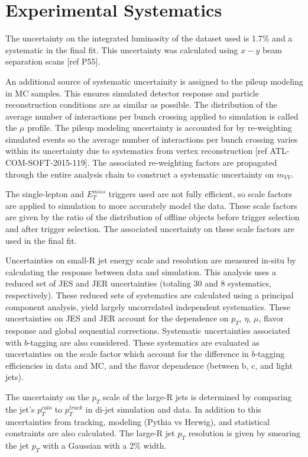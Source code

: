 \section{Experimental Systematics}
The uncertainty on the integrated luminosity of the dataset used is 1.7\% and a systematic in the final fit. This uncertainty was calculated using $x-y$ beam separation scans [ref P55]. 

An additional source of systematic uncertainity is assigned to the pileup modeling in MC samples. This ensures simulated detector response and particle reconstruction conditions are as similar as possible. The distribution of the average number of interactions per bunch crossing applied to simulation is called the $\mu$ profile. The pileup modeling uncertainty is accounted for by re-weighting simulated events so the average number of interactions per bunch crossing varies within its uncertainty due to systematics from vertex reconstruction [ref ATL-COM-SOFT-2015-119]. The associated re-weighting factors are propagated through the entire analysis chain to construct a systematic uncertainty on $m_{VV}$.

The single-lepton and $E_{T}^{miss}$ triggers used are not fully efficient, so scale factors are applied to simulation to more accurately model the data. These scale factors are given by the ratio of the distribution of offline objects before trigger selection and after trigger selection. The associated uncertainty on these scale factors are used in the final fit.

Uncertainties on small-R jet energy scale and resolution are measured in-situ by calculating the response between data and simulation. This analysis uses a reduced set of JES and JER uncertainties (totaling 30 and 8 systematics, respectively). These reduced sets of systematics are calculated using a principal component analysis, yield largely uncorrelated independent systematics. These uncertainties on JES and JER account for the dependence on $p_{T}$, $\eta$, $\mu$, flavor response and global sequential corrections. Systematic uncertainties associated with $b$-tagging are also considered. These systematics are evaluated as uncertainties on the scale factor which account for the difference in $b$-tagging efficiencies in data and MC, and the flavor dependence (between b, c, and light jets). 

The uncertainty on the $p_{T}$ scale of the large-R jets is determined by comparing the jet's $p_{T}^{calo}$ to $p_{T}^{track}$ in di-jet simulation and data. In addition to this uncertainties from tracking, modeling (Pythia vs Herwig), and statistical constraints are also calculated. The large-R jet $p_{T}$ resolution is given by smearing the jet $p_{T}$ with a Gaussian with a 2\% width.

